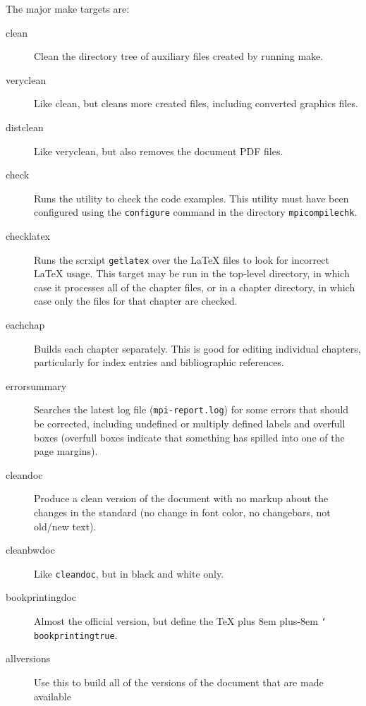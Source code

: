 \documentclass[letterpaper,twoside,11pt,fleqn]{article}
\def\cmd#1{\texttt{\char`\\#1}}
\def\gb{\penalty10000\hskip 0pt plus 8em\penalty4800\hskip 0pt plus-8em%
\penalty10000}
\begin{document}
The major make targets are:
\begin{description}
\item[clean]Clean the directory tree of auxiliary files created by running make.
\item[veryclean]Like clean, but cleans more created files, including
  converted graphics files.
\item[distclean]Like veryclean, but also removes the document PDF
  files.

\item[check]Runs the utility to check the code examples.  This utility
  must have been configured using the \texttt{configure} command in
  the directory \texttt{mpicompilechk}.

\item[checklatex]Runs the scrxipt \texttt{getlatex} over the LaTeX
  files to look for incorrect LaTeX usage.  This target may be run in
  the top-level directory, in which case it processes all of the
  chapter files, or in a chapter directory, in which case only the
  files for that chapter are checked.

\item[eachchap]Builds each chapter separately.  This is good for
  editing individual chapters, particularly for index entries and
  bibliographic references.

\item[errorsummary]Searches the latest log file
  (\texttt{mpi-report.log}) for some errors that should be corrected,
  including undefined or multiply defined labels and overfull boxes
  (overfull boxes indicate that something has spilled into one of the
  page margins).

\item[cleandoc]Produce a clean version of the document with no markup
  about the changes in the standard (no change in font color, no
  changebars, not old/new text).
\item[cleanbwdoc]Like \texttt{cleandoc}, but in black and white only.
\item[bookprintingdoc]Almost the official version, but define the
  TeX \gb\cmd{bookprintingtrue}.
\item[allversions]Use this to build all of the versions of the
  document that are made available


\end{description}
\end{document}
